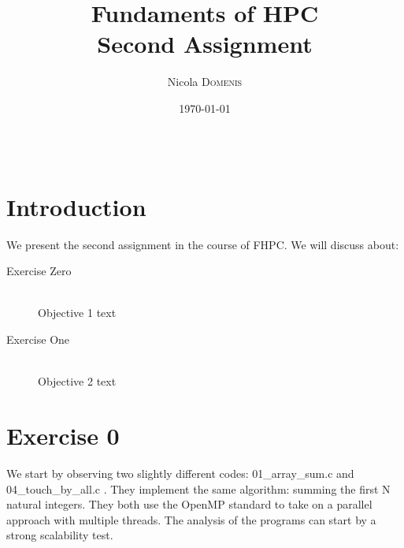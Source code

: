 \documentclass{article}
\title{Fundaments of HPC \\ Second Assignment} %
\author{Nicola \textsc{Domenis}} %
\date{\today} %
\begin{document}
\maketitle %

\begin{center}
\begin{tabular}{l r}

\end{tabular}
\end{center}



\section{Introduction}

We present the second assignment in the course of FHPC. We will discuss about:


\begin{description}
\item[Exercise Zero] \hfill \\
Objective 1 text
\item[Exercise One] \hfill \\
Objective 2 text
\end{description} 
 

\section{Exercise 0}

We start by observing two slightly different codes: 01\_array\_sum.c
and 04\_touch\_by\_all.c . They implement the same algorithm: summing the first N natural integers. They both use the OpenMP standard to take on a parallel approach with multiple threads.
The analysis of the programs can start by a strong scalability test.
\end{document}
